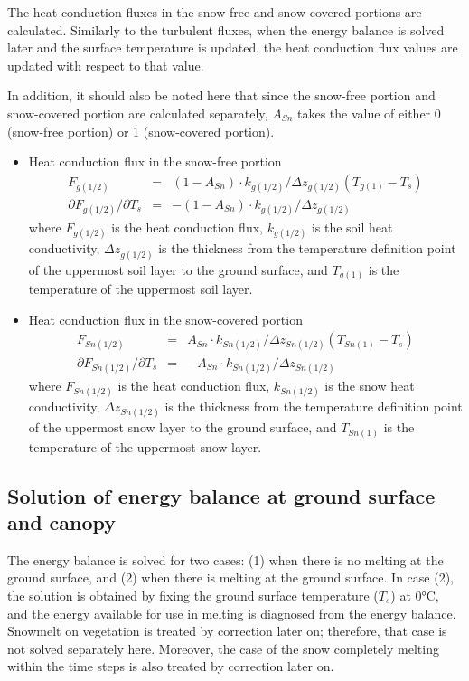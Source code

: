 The heat conduction fluxes in the snow-free and snow-covered portions are calculated. Similarly to the turbulent fluxes, when the energy balance is solved later and the surface temperature is updated,
the heat conduction flux values are updated with respect to that value.

In addition, it should also be noted here that since the snow-free portion and snow-covered portion are calculated separately, \(A_{Sn}\) takes the value of either 0 (snow-free portion) or 1
(snow-covered portion).

\begin{itemize}
\item
  Heat conduction flux in the snow-free portion \begin{eqnarray}
  F_{g(1/2)} &=& (1 - A_{Sn}) \cdot k_{g(1/2)} / \Delta z_{g(1/2)} (T_{g(1)} - T_s) \\
  \partial F_{g(1/2)}/\partial T_s &=&
  - (1 - A_{Sn}) \cdot k_{g(1/2)} / \Delta z_{g(1/2)}
  \end{eqnarray} where \(F_{g(1/2)}\) is the heat conduction flux, \(k_{g(1/2)}\) is the soil heat conductivity, \(\Delta z_{g(1/2)}\) is the thickness from the temperature definition point of the uppermost soil
  layer to the ground surface, and \(T_{g(1)}\) is the temperature of the uppermost soil layer.
\item
  Heat conduction flux in the snow-covered portion　 \begin{eqnarray}
  F_{Sn(1/2)} &=& A_{Sn} \cdot k_{Sn(1/2)} / \Delta z_{Sn(1/2)} (T_{Sn(1)} - T_s)
   \\
  \partial F_{Sn(1/2)}/\partial T_s &=&
  - A_{Sn} \cdot k_{Sn(1/2)} / \Delta z_{Sn(1/2)} \label{eq135}
  \end{eqnarray} where \(F_{Sn(1/2)}\) is the heat conduction flux, \(k_{Sn(1/2)}\) is the snow heat conductivity, \(\Delta z_{Sn(1/2)}\) is the thickness from the temperature definition point of the uppermost
  snow layer to the ground surface, and \(T_{Sn(1)}\) is the temperature of the uppermost snow layer.
\end{itemize}

\hypertarget{solution-of-energy-balance-at-ground-surface-and-canopy}{%
\subsection{Solution of energy balance at ground surface and canopy}\label{solution-of-energy-balance-at-ground-surface-and-canopy}}

The energy balance is solved for two cases: (1) when there is no melting at the ground surface, and (2) when there is melting at the ground surface. In case (2), the solution is obtained by fixing the
ground surface temperature (\(T_s\)) at 0°C, and the energy available for use in melting is diagnosed from the energy balance. Snowmelt on vegetation is treated by correction later on; therefore, that
case is not solved separately here. Moreover, the case of the snow completely melting within the time steps is also treated by correction later on.

